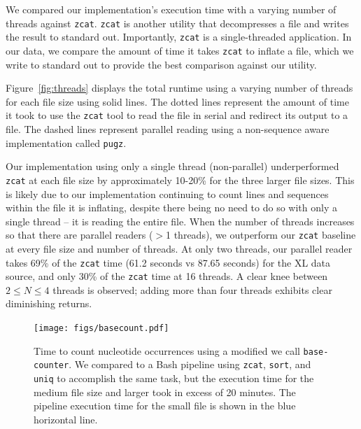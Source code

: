 We compared our \ireader implementation's execution time with a varying number
of threads against \texttt{zcat}. \texttt{zcat} is another \zlib utility that
decompresses a \gzip file and writes the result to standard out. Importantly,
\texttt{zcat} is a single-threaded application. In our data, we compare the
amount of time it takes \texttt{zcat} to inflate a file, which we write to
standard out to provide the best comparison against our \ireader utility.

Figure~\ref{fig:threads} displays the total \ireader runtime using a varying
number of threads for each file size using solid lines. The dotted lines
represent the amount of time it took to use the \texttt{zcat} tool to read the
file in serial and redirect its output to a file. The dashed lines represent
parallel \gzip reading using a non-sequence aware implementation called
\texttt{pugz}.

Our \ireader implementation using only a single thread (non-parallel) underperformed
\texttt{zcat} at each file size by approximately 10-20\% for the three larger
file sizes. This is likely due to our implementation continuing to count lines
and sequences within the \gzip file it is inflating, despite there being no need
to do so with only a single thread -- it is reading the entire file. When the
number of threads increases so that there are parallel readers ($>$1 threads),
we outperform our \texttt{zcat} baseline at every file size and number of
threads. At only two threads, our parallel reader takes 69\% of the
\texttt{zcat} time (61.2 seconds vs 87.65 seconds) for the XL data source, and
only 30\% of the \texttt{zcat} time at 16 threads. A clear knee between $2 \leq
N \leq 4$ threads is observed; adding more than four threads exhibits clear
diminishing returns.

\begin{figure}[h]
    \texttt{[image: figs/basecount.pdf]}
    \caption{Time to count nucleotide occurrences using a modified \ireader we
    call \texttt{base-counter}. We compared to a Bash pipeline using
    \texttt{zcat}, \texttt{sort}, and \texttt{uniq} to accomplish the same task,
    but the execution time for the medium file size and larger took in excess of
    20 minutes. The pipeline execution time for the small file is shown in the
    blue horizontal line.}
    \label{fig:basecounts}
\end{figure}

